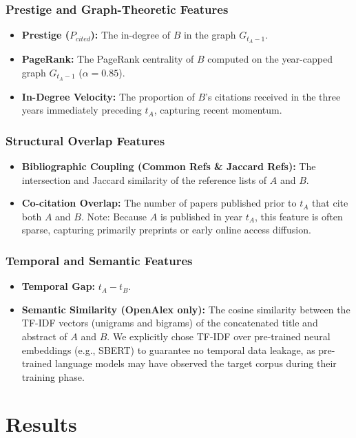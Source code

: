 \documentclass[11pt,a4paper]{article}
\begin{document}
\subsubsection{Prestige and Graph-Theoretic Features}
\begin{itemize}
    \item \textbf{Prestige ($P_{cited}$):} The in-degree of $B$ in the graph $G_{t_A - 1}$.
    \item \textbf{PageRank:} The PageRank centrality of $B$ computed on the year-capped graph $G_{t_A - 1}$ ($\alpha = 0.85$).
    \item \textbf{In-Degree Velocity:} The proportion of $B$'s citations received in the three years immediately preceding $t_A$, capturing recent momentum.
\end{itemize}

\subsubsection{Structural Overlap Features}
\begin{itemize}
    \item \textbf{Bibliographic Coupling (Common Refs \& Jaccard Refs):} The intersection and Jaccard similarity of the reference lists of $A$ and $B$.
    \item \textbf{Co-citation Overlap:} The number of papers published prior to $t_A$ that cite both $A$ and $B$. Note: Because $A$ is published in year $t_A$, this feature is often sparse, capturing primarily preprints or early online access diffusion.
\end{itemize}

\subsubsection{Temporal and Semantic Features}
\begin{itemize}
    \item \textbf{Temporal Gap:} $t_A - t_B$.
    \item \textbf{Semantic Similarity (OpenAlex only):} The cosine similarity between the TF-IDF vectors (unigrams and bigrams) of the concatenated title and abstract of $A$ and $B$. We explicitly chose TF-IDF over pre-trained neural embeddings (e.g., SBERT) to guarantee no temporal data leakage, as pre-trained language models may have observed the target corpus during their training phase.
\end{itemize}

\section{Results}
\end{document}
